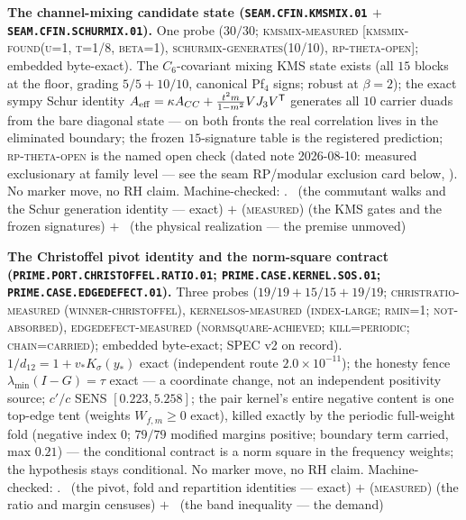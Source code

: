 \documentclass[11pt,a4paper]{article}
\theoremstyle{definition}
\begin{document}
\par\smallskip\noindent\textbf{The channel-mixing candidate
state (\texttt{SEAM.CFIN.\allowbreak KMSMIX.01} $+$
\texttt{SEAM.CFIN.\allowbreak SCHURMIX.01}).}
One probe ($30/30$; \textsc{kmsmix-measured [kmsmix-found(u=1,
t=1/8, beta=1), schurmix-generates(10/10), rp-theta-open]};
embedded byte-exact).  The $C_6$-covariant mixing KMS state
exists (all $15$ blocks at the floor, grading $5/5 + 10/10$,
canonical Pf$_4$ signs; robust at $\beta = 2$); the exact sympy
Schur identity $A_{\rm eff} = \kappa A_{CC} + \tfrac{t^2
m}{1-m^2} V J_3 V^{\mathsf T}$ generates all $10$ carrier duads
from the bare diagonal state --- on both fronts the real
correlation lives in the eliminated boundary; the frozen
$15$-signature table is the registered prediction;
\textsc{rp-theta-open} is the named open check (dated note
2026-08-10: measured exclusionary at family level --- see the
seam RP/modular exclusion card below,
).  No marker move,
no RH claim.
Machine-checked: .
\mE\ (the commutant walks and the Schur generation identity ---
exact) $+$ (\textsc{measured}) (the KMS gates and the frozen
signatures) $+$ \mO\ (the physical realization --- the premise
unmoved)
\par\smallskip

\par\smallskip\noindent\textbf{The Christoffel pivot identity
and the norm-square contract
(\texttt{PRIME.PORT.CHRISTOFFEL.\allowbreak RATIO.01};
\texttt{PRIME.CASE.KERNEL.\allowbreak SOS.01};
\texttt{PRIME.CASE.\allowbreak EDGEDEFECT.01}).}
Three probes ($19/19 + 15/15 + 19/19$;
\textsc{christratio-measured (winner-christoffel)},
\textsc{kernelsos-measured (index-large; rmin=1;
not-absorbed)}, \textsc{edgedefect-measured
(normsquare-achieved; kill=periodic; chain=carried)}; embedded
byte-exact; SPEC v2 on record).  $1/d_{12} = 1 + v_{*}
K_\sigma(y_{*})$ exact (independent route $2.0\times10^{-11}$);
the honesty fence $\lambda_{\min}(I-G) = \tau$ exact --- a
coordinate change, not an independent positivity source; $c'/c$
SENS $[0.223, 5.258]$; the pair kernel's entire negative
content is one top-edge tent (weights $W_{f,m} \ge 0$ exact),
killed exactly by the periodic full-weight fold (negative index
$0$; $79/79$ modified margins positive; boundary term carried,
max $0.21$) --- the conditional contract is a norm square in
the frequency weights; the hypothesis stays conditional.  No
marker move, no RH claim.
Machine-checked: .
\mE\ (the pivot, fold and repartition identities --- exact) $+$
(\textsc{measured}) (the ratio and margin censuses) $+$ \mO\
(the band inequality --- the demand)
\par\smallskip
\end{document}
